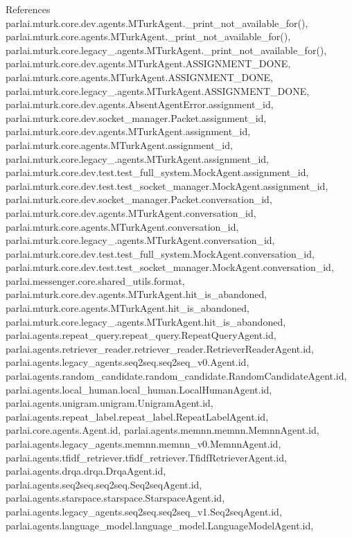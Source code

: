 References parlai.\+mturk.\+core.\+dev.\+agents.\+M\+Turk\+Agent.\+\_\+print\+\_\+not\+\_\+available\+\_\+for(), parlai.\+mturk.\+core.\+agents.\+M\+Turk\+Agent.\+\_\+print\+\_\+not\+\_\+available\+\_\+for(), parlai.\+mturk.\+core.\+legacy\+\_.\+agents.\+M\+Turk\+Agent.\+\_\+print\+\_\+not\+\_\+available\+\_\+for(), parlai.\+mturk.\+core.\+dev.\+agents.\+M\+Turk\+Agent.\+A\+S\+S\+I\+G\+N\+M\+E\+N\+T\+\_\+\+D\+O\+NE, parlai.\+mturk.\+core.\+agents.\+M\+Turk\+Agent.\+A\+S\+S\+I\+G\+N\+M\+E\+N\+T\+\_\+\+D\+O\+NE, parlai.\+mturk.\+core.\+legacy\+\_.\+agents.\+M\+Turk\+Agent.\+A\+S\+S\+I\+G\+N\+M\+E\+N\+T\+\_\+\+D\+O\+NE, parlai.\+mturk.\+core.\+dev.\+agents.\+Absent\+Agent\+Error.\+assignment\+\_\+id, parlai.\+mturk.\+core.\+dev.\+socket\+\_\+manager.\+Packet.\+assignment\+\_\+id, parlai.\+mturk.\+core.\+dev.\+agents.\+M\+Turk\+Agent.\+assignment\+\_\+id, parlai.\+mturk.\+core.\+agents.\+M\+Turk\+Agent.\+assignment\+\_\+id, parlai.\+mturk.\+core.\+legacy\+\_.\+agents.\+M\+Turk\+Agent.\+assignment\+\_\+id, parlai.\+mturk.\+core.\+dev.\+test.\+test\+\_\+full\+\_\+system.\+Mock\+Agent.\+assignment\+\_\+id, parlai.\+mturk.\+core.\+dev.\+test.\+test\+\_\+socket\+\_\+manager.\+Mock\+Agent.\+assignment\+\_\+id, parlai.\+mturk.\+core.\+dev.\+socket\+\_\+manager.\+Packet.\+conversation\+\_\+id, parlai.\+mturk.\+core.\+dev.\+agents.\+M\+Turk\+Agent.\+conversation\+\_\+id, parlai.\+mturk.\+core.\+agents.\+M\+Turk\+Agent.\+conversation\+\_\+id, parlai.\+mturk.\+core.\+legacy\+\_.\+agents.\+M\+Turk\+Agent.\+conversation\+\_\+id, parlai.\+mturk.\+core.\+dev.\+test.\+test\+\_\+full\+\_\+system.\+Mock\+Agent.\+conversation\+\_\+id, parlai.\+mturk.\+core.\+dev.\+test.\+test\+\_\+socket\+\_\+manager.\+Mock\+Agent.\+conversation\+\_\+id, parlai.\+messenger.\+core.\+shared\+\_\+utils.\+format, parlai.\+mturk.\+core.\+dev.\+agents.\+M\+Turk\+Agent.\+hit\+\_\+is\+\_\+abandoned, parlai.\+mturk.\+core.\+agents.\+M\+Turk\+Agent.\+hit\+\_\+is\+\_\+abandoned, parlai.\+mturk.\+core.\+legacy\+\_.\+agents.\+M\+Turk\+Agent.\+hit\+\_\+is\+\_\+abandoned, parlai.\+agents.\+repeat\+\_\+query.\+repeat\+\_\+query.\+Repeat\+Query\+Agent.\+id, parlai.\+agents.\+retriever\+\_\+reader.\+retriever\+\_\+reader.\+Retriever\+Reader\+Agent.\+id, parlai.\+agents.\+legacy\+\_\+agents.\+seq2seq.\+seq2seq\+\_\+v0.\+Agent.\+id, parlai.\+agents.\+random\+\_\+candidate.\+random\+\_\+candidate.\+Random\+Candidate\+Agent.\+id, parlai.\+agents.\+local\+\_\+human.\+local\+\_\+human.\+Local\+Human\+Agent.\+id, parlai.\+agents.\+unigram.\+unigram.\+Unigram\+Agent.\+id, parlai.\+agents.\+repeat\+\_\+label.\+repeat\+\_\+label.\+Repeat\+Label\+Agent.\+id, parlai.\+core.\+agents.\+Agent.\+id, parlai.\+agents.\+memnn.\+memnn.\+Memnn\+Agent.\+id, parlai.\+agents.\+legacy\+\_\+agents.\+memnn.\+memnn\+\_\+v0.\+Memnn\+Agent.\+id, parlai.\+agents.\+tfidf\+\_\+retriever.\+tfidf\+\_\+retriever.\+Tfidf\+Retriever\+Agent.\+id, parlai.\+agents.\+drqa.\+drqa.\+Drqa\+Agent.\+id, parlai.\+agents.\+seq2seq.\+seq2seq.\+Seq2seq\+Agent.\+id, parlai.\+agents.\+starspace.\+starspace.\+Starspace\+Agent.\+id, parlai.\+agents.\+legacy\+\_\+agents.\+seq2seq.\+seq2seq\+\_\+v1.\+Seq2seq\+Agent.\+id, parlai.\+agents.\+language\+\_\+model.\+language\+\_\+model.\+Language\+Model\+Agent.\+id, 